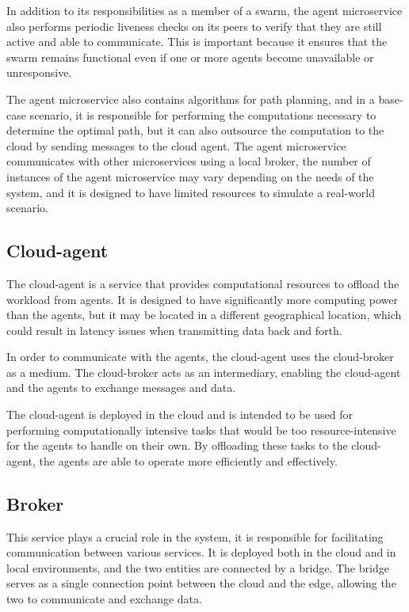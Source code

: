 In addition to its responsibilities as a member of a swarm, the agent microservice also performs periodic liveness checks on its peers to verify that they are still active and able to communicate. This is important because it ensures that the swarm remains functional even if one or more agents become unavailable or unresponsive.

The agent microservice also contains algorithms for path planning, and in a base-case scenario, it is responsible for performing the computations necessary to determine the optimal path, but it can also outsource the computation to the cloud by sending messages to the cloud agent. The agent microservice communicates with other microservices using a local broker, the number of instances of the agent microservice may vary depending on the needs of the system, and it is designed to have limited resources to simulate a real-world scenario. 

\subsection{Cloud-agent}
The cloud-agent is a service that provides computational resources to offload the workload from agents. It is designed to have significantly more computing power than the agents, but it may be located in a different geographical location, which could result in latency issues when transmitting data back and forth.

In order to communicate with the agents, the cloud-agent uses the cloud-broker as a medium. The cloud-broker acts as an intermediary, enabling the cloud-agent and the agents to exchange messages and data.

The cloud-agent is deployed in the cloud and is intended to be used for performing computationally intensive tasks that would be too resource-intensive for the agents to handle on their own. By offloading these tasks to the cloud-agent, the agents are able to operate more efficiently and effectively.

\subsection{Broker}
This service plays a crucial role in the system, it is responsible for facilitating communication between various services. It is deployed both in the cloud and in local environments, and the two entities are connected by a bridge. The bridge serves as a single connection point between the cloud and the edge, allowing the two to communicate and exchange data.

